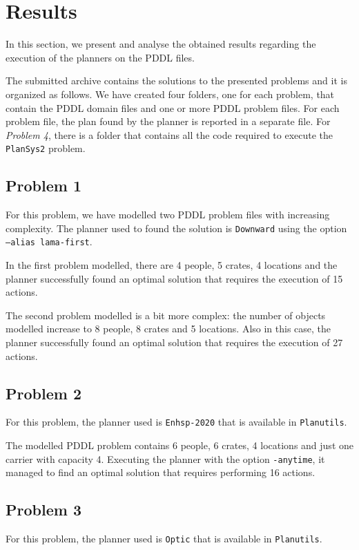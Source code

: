 \section{Results}
\label{sec4}
In this section, we present and analyse the obtained results regarding the execution of the planners on 
the PDDL files.

The submitted archive contains the solutions to the presented problems and it is organized as follows.
We have created four folders, one for each problem, that contain the PDDL domain files and one or more 
PDDL problem files. For each problem file, the plan found by the planner is reported in a separate file.
For \textit{Problem 4}, there is a folder that contains all the code required to execute the \texttt{PlanSys2} 
problem.


\subsection{Problem 1}
For this problem, we have modelled two PDDL problem files with increasing complexity.
The planner used to found the solution is \texttt{Downward} using the option \texttt{--alias lama-first}.

In the first problem modelled, there are 4 people, 5 crates, 4 locations and the planner successfully
found an optimal solution that requires the execution of 15 actions.

The second problem modelled is a bit more complex: the number of objects modelled increase to 8 people, 
8 crates and 5 locations. Also in this case, the planner successfully
found an optimal solution that requires the execution of 27 actions.


\subsection{Problem 2}
For this problem, the planner used is \texttt{Enhsp-2020} that is available in \texttt{Planutils}.

The modelled PDDL problem contains 6 people, 6 crates, 4 locations and just one carrier with capacity 4.
Executing the planner with the option \texttt{-anytime}, it managed to find an optimal solution that 
requires performing 16 actions.

\subsection{Problem 3}
For this problem, the planner used is \texttt{Optic} that is available in \texttt{Planutils}.

